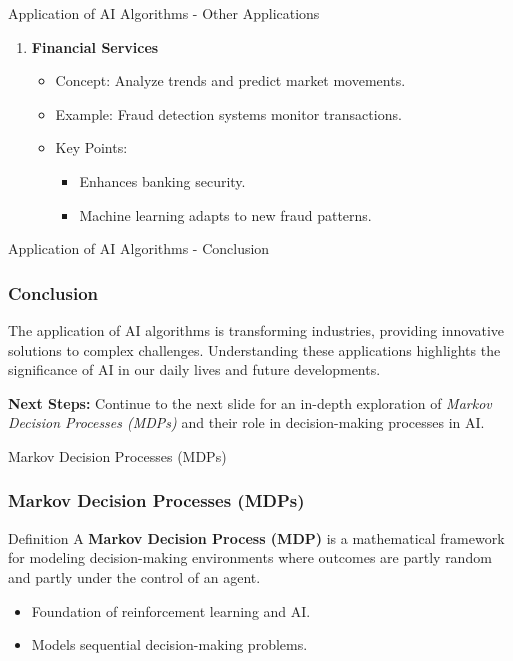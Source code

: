 \documentclass[aspectratio=169]{beamer}
\begin{document}
\begin{frame}[fragile]{Application of AI Algorithms - Other Applications}
\begin{enumerate}
        \item \textbf{Financial Services}
        \begin{itemize}
            \item Concept: Analyze trends and predict market movements.
            \item Example: Fraud detection systems monitor transactions.
            \item Key Points:
            \begin{itemize}
                \item Enhances banking security.
                \item Machine learning adapts to new fraud patterns.
            \end{itemize}
        \end{itemize}
    \end{enumerate}
\end{frame}

\begin{frame}[fragile]{Application of AI Algorithms - Conclusion}
    \frametitle{Conclusion}
    The application of AI algorithms is transforming industries, providing innovative solutions to complex challenges. Understanding these applications highlights the significance of AI in our daily lives and future developments.

    \textbf{Next Steps:} Continue to the next slide for an in-depth exploration of \textit{Markov Decision Processes (MDPs)} and their role in decision-making processes in AI.
\end{frame}

\begin{frame}[fragile]{Markov Decision Processes (MDPs)}
    \frametitle{Markov Decision Processes (MDPs)}
    \begin{block}{Definition}
        A \textbf{Markov Decision Process (MDP)} is a mathematical framework for modeling decision-making environments where outcomes are partly random and partly under the control of an agent. 
    \end{block}
    \begin{itemize}
        \item Foundation of reinforcement learning and AI.
        \item Models sequential decision-making problems.
    \end{itemize}
\end{frame}
\end{document}
